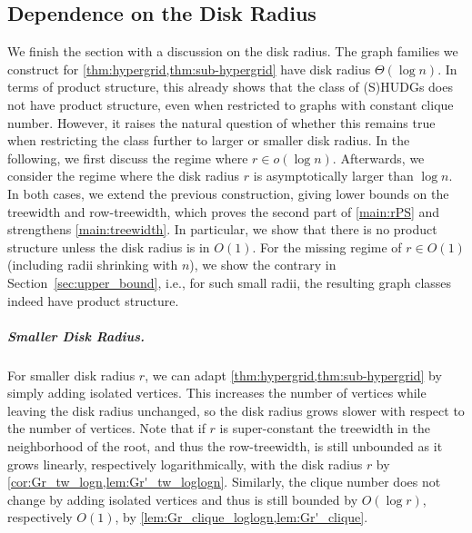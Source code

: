 \documentclass[11pt]{article}
\providecommand{\todo}[2][]{}
\begin{document}
\subsection{Dependence on the Disk Radius}
\label{sec:disk-radius}
%
%
We finish the section with a discussion on the disk radius.
The graph families we construct for \cref{thm:hypergrid,thm:sub-hypergrid} have disk radius $ \Theta(\log n) $.
In terms of product structure, this already shows that the class of (S)HUDGs does not have product structure, even when restricted to graphs with constant clique number.
However, it raises the natural question of whether this remains true when restricting the class further to larger or smaller disk radius.
In the following, we first discuss the regime where $r \in o(\log n)$.
Afterwards, we consider the regime where the disk radius $r$ is asymptotically larger than $\log n$.
In both cases, we extend the previous construction, giving lower bounds on the treewidth and row-treewidth, which proves the second part of \cref{main:rPS} and strengthens \cref{main:treewidth}.
In particular, we show that there is no product structure unless the disk radius is in $ O(1) $.
For the missing regime of $r \in O(1)$ (including radii shrinking with $n$), we show the contrary in Section~\ref{sec:upper_bound}, i.e., for such small radii, the resulting graph classes indeed have product structure.
%
%
% 
%
%
\subparagraph{Smaller Disk Radius.}
%
For smaller disk radius $r$, we can adapt \cref{thm:hypergrid,thm:sub-hypergrid} by simply adding isolated vertices.
This increases the number of vertices while leaving the disk radius unchanged, so the disk radius grows slower with respect to the number of vertices.
Note that if $ r $ is super-constant the treewidth in the neighborhood of the root, and thus the row-treewidth, is still unbounded as it grows linearly, respectively logarithmically, with the disk radius $ r $ by \cref{cor:Gr_tw_logn,lem:Gr'_tw_loglogn}.
Similarly, the clique number does not change by adding isolated vertices and thus is still bounded by $ O(\log r) $, respectively $ O(1) $, by \cref{lem:Gr_clique_loglogn,lem:Gr'_clique}.
\end{document}
